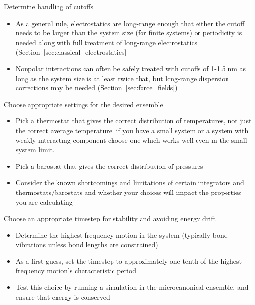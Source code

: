 \documentclass[9pt,bestpractices]{livecoms}
\begin{document}
\begin{Checklists*}[p!]
\begin{checklist}{Determine handling of cutoffs}
\begin{itemize}
\item As a general rule, electrostatics are long-range enough that either the cutoff needs to be larger than the system size (for finite systems) or
periodicity is needed along with full treatment of long-range electrostatics (Section~\ref{sec:classical_electrostatics} %
\item Nonpolar interactions can often be safely treated with cutoffs of 1-1.5 nm as long as the system size is at least twice that, but long-range dispersion corrections may be needed (Section~\ref{sec:force_fields})
\end{itemize}
\end{checklist}

\begin{checklist}{Choose appropriate settings for the desired ensemble}
\begin{itemize}
\item Pick a thermostat that gives the correct distribution of temperatures, not just the correct average temperature; if you have a small system or a system with weakly interacting component choose one which works well even in the small-system limit.
\item Pick a barostat that gives the correct distribution of pressures
\item Consider the known shortcomings and limitations of certain integrators and thermostats/barostats and whether your choices will impact the properties you are calculating
\end{itemize}
\end{checklist}


\begin{checklist}{Choose an appropriate timestep for stability and avoiding energy drift}
\begin{itemize}
\item Determine the highest-frequency motion in the system (typically bond vibrations unless bond lengths are constrained)
\item As a first guess, set the timestep to approximately one tenth of the highest-frequency motion's characteristic period
\item Test this choice by running a simulation in the microcanonical ensemble, and ensure that energy is conserved
\end{itemize}
\end{checklist}


\end{Checklists*}
\end{document}
